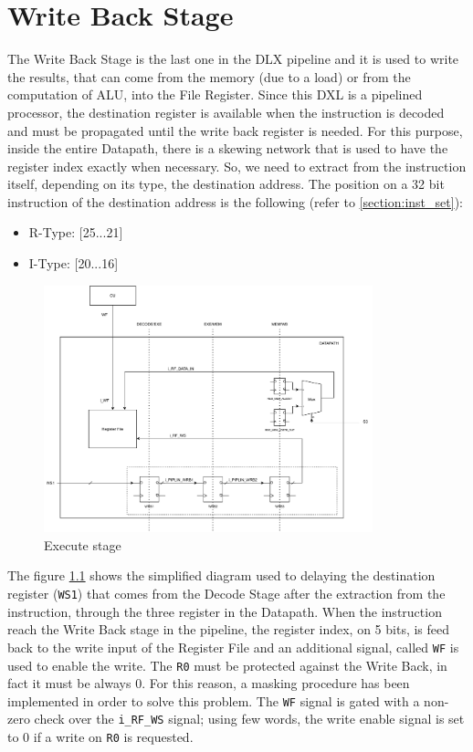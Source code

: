 \chapter{Write Back Stage}
The Write Back Stage is the last one in the DLX pipeline and it is used to write the results, that can come from the memory (due to a load) or from the computation of ALU, into the File Register.
Since this DXL is a pipelined processor, the destination register is available when the instruction is decoded and must be propagated until the write back register is needed. For this purpose, inside the entire Datapath, there is a skewing network that is used to have the register index exactly when necessary. \newline\newline
So, we need to extract from the instruction itself, depending on its type, the destination address. The position on a 32 bit instruction of the destination address is the following (refer to \ref{section:inst_set}):
\begin{itemize}
	\itemsep0sp
	\item R-Type: [25...21]
	\item I-Type: [20...16]
\end{itemize}
\begin{figure}[H]   
	\centering
	\includegraphics[width=0.85\textwidth]{chapters/7_WriteBackStage/images/writeback.pdf}
	\caption{Execute stage}
	\label{fig:wb_stage}
\end{figure}
The figure \ref{fig:wb_stage} shows the simplified diagram used to delaying the destination register (\texttt{WS1}) that comes from the Decode Stage after the extraction from the instruction, through the three register in the Datapath.
When the instruction reach the Write Back stage in the pipeline, the register index, on 5 bits, is feed back to the write input of the Register File and an additional signal, called \texttt{WF} is used to enable the write.\newline\newline
The \texttt{R0} must be protected against the Write Back, in fact it must be always 0. For this reason, a masking procedure has been implemented in order to solve this problem. The \texttt{WF} signal is gated with a non-zero check over the \texttt{i\_RF\_WS} signal; using few words, the write enable signal is set to 0 if a write on \texttt{R0} is requested.

